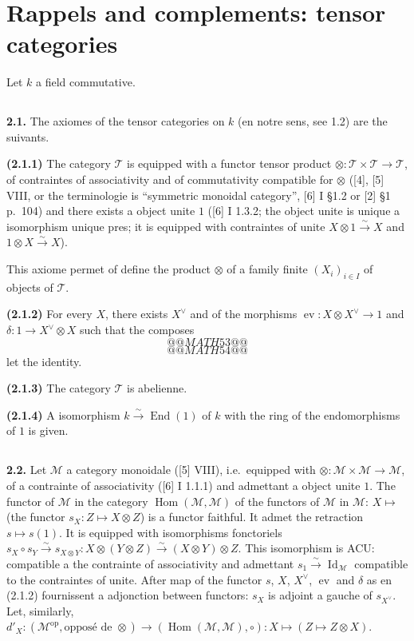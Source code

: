\documentclass[12pt,a4paper]{article}
\theoremstyle{plain}
\theoremstyle{definition}
\theoremstyle{remark}
\DeclareMathOperator{\Hom}{Hom}
\DeclareMathOperator{\End}{End}
\DeclareMathOperator{\Id}{Id}
\DeclareMathOperator{\ev}{ev}
\begin{document}
\section{Rappels and complements: tensor categories}

Let $k$ a field commutative.

\subsection{}

\textbf{2.1.} The axiomes of the tensor categories on $k$ (en notre sens, see 1.2) are the suivants.

\textbf{(2.1.1)} The category $\mathcal{T}$ is equipped with a functor tensor product $\otimes : \mathcal{T} \times \mathcal{T} \to \mathcal{T}$, of contraintes of associativity and of commutativity compatible for $\otimes$ ([4], [5] VIII, or the terminologie is ``symmetric monoidal category'', [6] I \S 1.2 or [2] \S 1 p.~104) and there exists a object unite $1$ ([6] I 1.3.2; the object unite is unique a isomorphism unique pres; it is equipped with contraintes of unite $X \otimes 1 \xrightarrow{\sim} X$ and $1 \otimes X \xrightarrow{\sim} X$).

This axiome permet of define the product $\otimes$ of a family finite $(X_i)_{i \in I}$ of objects of $\mathcal{T}$.

\textbf{(2.1.2)} For every $X$, there exists $X^\vee$ and of the morphisms $\ev : X \otimes X^\vee \to 1$ and $\delta : 1 \to X^\vee \otimes X$ such that the composes
\[
@@MATH53@@
\]
\[
@@MATH54@@
\]
let the identity.

\textbf{(2.1.3)} The category $\mathcal{T}$ is abelienne.

\textbf{(2.1.4)} A isomorphism $k \xrightarrow{\sim} \End(1)$ of $k$ with the ring of the endomorphisms of $1$ is given.

\subsection{}

\textbf{2.2.} Let $\mathcal{M}$ a category monoidale ([5] VIII), i.e.~equipped with $\otimes : \mathcal{M} \times \mathcal{M} \to \mathcal{M}$, of a contrainte of associativity ([6] I 1.1.1) and admettant a object unite $1$. The functor of $\mathcal{M}$ in the category $\Hom(\mathcal{M},\mathcal{M})$ of the functors of $\mathcal{M}$ in $\mathcal{M}$: $X \mapsto$ (the functor $s_X : Z \mapsto X \otimes Z$) is a functor faithful. It admet the retraction $s \mapsto s(1)$. It is equipped with isomorphisms fonctoriels $s_X \circ s_Y \xrightarrow{\sim} s_{X \otimes Y} : X \otimes (Y \otimes Z) \xrightarrow{\sim} (X \otimes Y) \otimes Z$. This isomorphism is ACU: compatible a the contrainte of associativity and admettant $s_1 \xrightarrow{\sim} \Id_\mathcal{M}$ compatible to the contraintes of unite. After map of the functor $s$, $X$, $X^\vee$, $\ev$ and $\delta$ as en (2.1.2) fournissent a adjonction between functors: $s_X$ is adjoint a gauche of $s_{X^\vee}$. Let, similarly, $d'_X : (\mathcal{M}^\mathrm{op}, \text{opposé de } \otimes) \to (\Hom(\mathcal{M},\mathcal{M}), \circ) : X \mapsto (Z \mapsto Z \otimes X)$.
\end{document}
